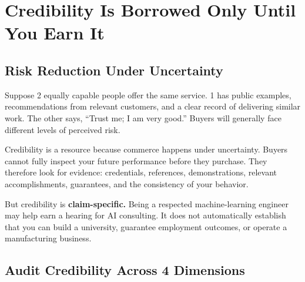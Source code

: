 \section{Credibility Is Borrowed Only Until You Earn It}

\subsection{Risk Reduction Under Uncertainty}

Suppose 2 equally capable people offer the same service. 1 has public examples, recommendations from relevant customers, and a clear record of delivering similar work. The other says, ``Trust me; I am very good.'' Buyers will generally face different levels of perceived risk.

Credibility is a resource because commerce happens under uncertainty. Buyers cannot fully inspect your future performance before they purchase. They therefore look for evidence: credentials, references, demonstrations, relevant accomplishments, guarantees, and the consistency of your behavior.

But credibility is \textbf{claim-specific.} Being a respected machine-learning engineer may help earn a hearing for AI consulting. It does not automatically establish that you can build a university, guarantee employment outcomes, or operate a manufacturing business.

\subsection{Audit Credibility Across 4 Dimensions}

